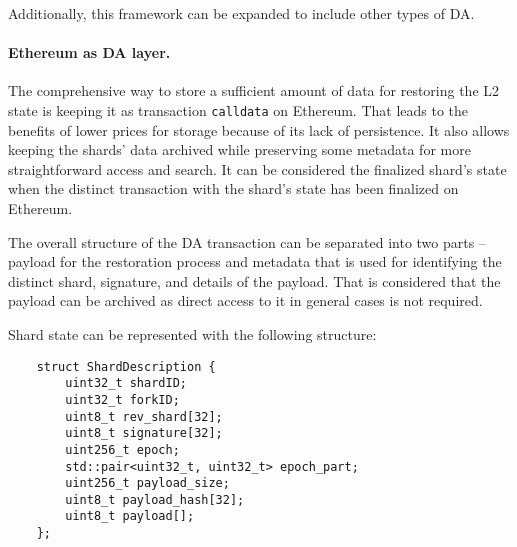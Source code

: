 Additionally, this framework can be expanded to include other types of DA.

\paragraph{Ethereum as DA layer.}
The comprehensive way to store a sufficient amount of data for restoring the L2 state is 
keeping it as transaction \texttt{calldata} on Ethereum.
That leads to the benefits of lower prices for storage because of its 
lack of persistence.
It also allows keeping the shards' data archived while preserving 
some metadata for more straightforward access and search.
It can be considered the finalized shard's state when 
the distinct transaction with the 
shard's state has been finalized on Ethereum. 

The overall structure of the DA transaction can be separated into two parts -- payload for the 
restoration process and metadata that is used for identifying the distinct shard, signature, 
and details of the payload. 
That is considered that the payload can be archived as direct 
access to it in general cases is not required.



Shard state can be represented with the following structure:
\\
\begin{verbatim}
    struct ShardDescription {
        uint32_t shardID;
        uint32_t forkID;
        uint8_t rev_shard[32];
        uint8_t signature[32];
        uint256_t epoch;
        std::pair<uint32_t, uint32_t> epoch_part;
        uint256_t payload_size;
        uint8_t payload_hash[32];
        uint8_t payload[];
    };
\end{verbatim}


